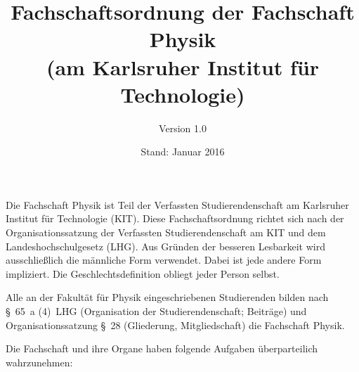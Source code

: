 \documentclass[a4paper, parskip=half, numbers=noenddot]{scrartcl}
\title{Fachschaftsordnung der Fachschaft Physik\\(am Karlsruher Institut für Technologie)}
\author{Version 1.0}
\date{Stand: Januar 2016}
\begin{document}
%
%

\maketitle
\thispagestyle{empty}

\pagestyle{empty}
\newpage
\rule{0mm}{0mm}
\newpage


\begin{contract}

\setcounter{page}{1}
\pagestyle{plain}


%
%

\tableofcontents
\newpage


%
%

Die Fachschaft Physik ist Teil der Verfassten Studierendenschaft am Karlsruher Institut für Technologie (KIT). Diese Fachschaftsordnung richtet sich nach der Organisationssatzung der Verfassten Studierendenschaft am KIT und dem Landeshochschulgesetz (LHG). Aus Gründen der besseren Lesbarkeit wird ausschließlich die männliche Form verwendet. Dabei ist jede andere Form impliziert. Die Geschlechtsdefinition obliegt jeder Person selbst.


%
%


Alle an der Fakultät für Physik eingeschriebenen Studierenden
bilden nach §~65~a (4)~LHG (Organisation der Studierendenschaft; Beiträge) und Organisationssatzung §~28 (Gliederung, Mitgliedschaft) die Fachschaft Physik.


%
%

%
\label{fs:aufgaben}

Die Fachschaft und ihre Organe haben folgende Aufgaben überparteilich wahrzunehmen:


\end{contract}
\end{document}
